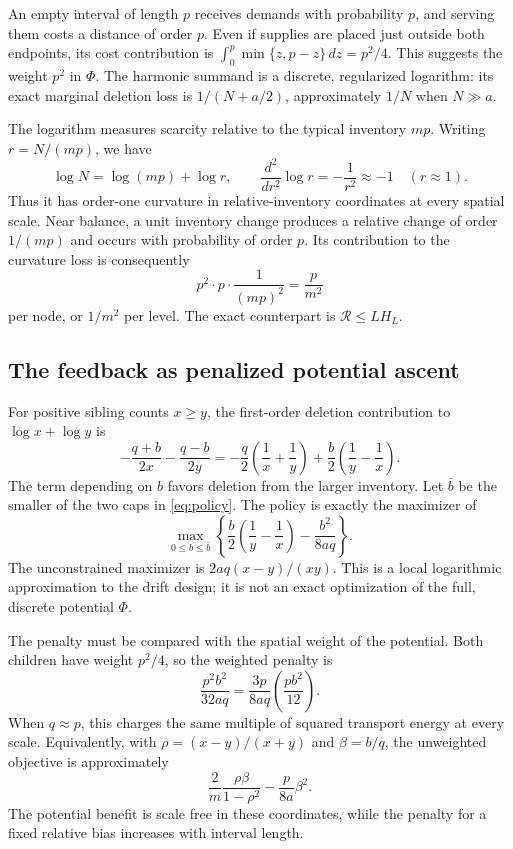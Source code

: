 \documentclass[11pt]{article}
\numberwithin{equation}{section}
\theoremstyle{remark}
\begin{document}
An empty interval of length \(p\) receives demands with probability \(p\),
and serving them costs a distance of order \(p\). Even if supplies are
placed just outside both endpoints, its cost contribution is
\(\int_0^p\min\{z,p-z\}\,dz=p^2/4\).
This suggests the weight \(p^2\) in \(\Phi\).
The harmonic summand is a discrete, regularized logarithm: its exact
marginal deletion loss is \(1/(N+a/2)\), approximately \(1/N\) when
\(N\gg a\).

The logarithm measures scarcity relative to the typical inventory \(mp\).
Writing \(r=N/(mp)\), we have
\[
\log N=\log(mp)+\log r,\qquad
\frac{d^2}{dr^2}\log r=-\frac1{r^2}\approx-1\quad(r\approx1).
\]
Thus it has order-one curvature in relative-inventory coordinates at
every spatial scale. Near balance, a unit inventory change produces a
relative change of order \(1/(mp)\) and occurs with probability of order
\(p\). Its contribution to the curvature loss is consequently
\[
p^2\cdot p\cdot\frac1{(mp)^2}=\frac p{m^2}
\]
per node, or \(1/m^2\) per level. The exact counterpart is
\(\mathcal R\le LH_L\).

\subsection{The feedback as penalized potential ascent}

For positive sibling counts \(x\ge y\), the first-order deletion
contribution to \(\log x+\log y\) is
\[
-\frac{q+b}{2x}-\frac{q-b}{2y}
=-\frac q2\left(\frac1x+\frac1y\right)
+\frac b2\left(\frac1y-\frac1x\right).
\]
The term depending on \(b\) favors deletion from the larger inventory.
Let \(\bar b\) be the smaller of the two caps in \eqref{eq:policy}.
The policy is exactly the maximizer of
\begin{equation}\label{eq:penalized-ascent}
\max_{0\le b\le\bar b}
\left\{\frac b2\left(\frac1y-\frac1x\right)-\frac{b^2}{8aq}\right\}.
\end{equation}
The unconstrained maximizer is \(2aq(x-y)/(xy)\). This is a local
logarithmic approximation to the drift design; it is not an exact
optimization of the full, discrete potential \(\Phi\).

The penalty must be compared with the spatial weight of the potential.
Both children have weight \(p^2/4\), so the weighted penalty is
\[
\frac{p^2b^2}{32aq}
=\frac{3p}{8aq}\left(\frac{pb^2}{12}\right).
\]
When \(q\approx p\), this charges the same multiple of squared transport
energy at every scale. Equivalently, with
\(\rho=(x-y)/(x+y)\) and \(\beta=b/q\), the unweighted objective is
approximately
\[
\frac2m\frac{\rho\beta}{1-\rho^2}-\frac p{8a}\beta^2.
\]
The potential benefit is scale free in these coordinates, while the
penalty for a fixed relative bias increases with interval length.
\end{document}
